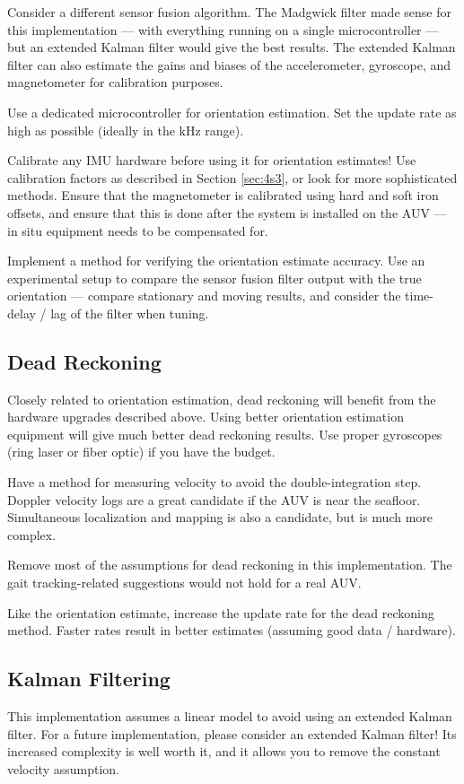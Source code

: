 \documentclass[11pt]{ucthesisCP}
\begin{document}
Consider a different sensor fusion algorithm. The Madgwick filter made sense for this implementation --- with everything running on a single microcontroller --- but an extended Kalman filter would give the best results. The extended Kalman filter can also estimate the gains and biases of the accelerometer, gyroscope, and magnetometer for calibration purposes.

Use a dedicated microcontroller for orientation estimation. Set the update rate as high as possible (ideally in the kHz range).

Calibrate any IMU hardware before using it for orientation estimates! Use calibration factors as described in Section \ref{sec:4s3}, or look for more sophisticated methods. Ensure that the magnetometer is calibrated using hard and soft iron offsets, and ensure that this is done after the system is installed on the AUV --- in situ equipment needs to be compensated for.

Implement a method for verifying the orientation estimate accuracy. Use an experimental setup to compare the sensor fusion filter output with the true orientation --- compare stationary and moving results, and consider the time-delay / lag of the filter when tuning.

\subsection{Dead Reckoning} \label{sec:7s1s5}
Closely related to orientation estimation, dead reckoning will benefit from the hardware upgrades described above. Using better orientation estimation equipment will give much better dead reckoning results. Use proper gyroscopes (ring laser or fiber optic) if you have the budget.

Have a method for measuring velocity to avoid the double-integration step. Doppler velocity logs are a great candidate if the AUV is near the seafloor. Simultaneous localization and mapping is also a candidate, but is much more complex.

Remove most of the assumptions for dead reckoning in this implementation. The gait tracking-related suggestions would not hold for a real AUV.

Like the orientation estimate, increase the update rate for the dead reckoning method. Faster rates result in better estimates (assuming good data / hardware).

\subsection{Kalman Filtering} \label{sec:7s1s6}
This implementation assumes a linear model to avoid using an extended Kalman filter. For a future implementation, please consider an extended Kalman filter! Its increased complexity is well worth it, and it allows you to remove the constant velocity assumption.
\end{document}

